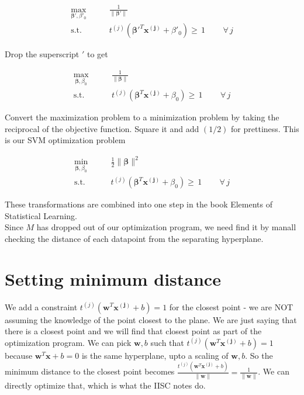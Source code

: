 \documentclass{article}
\newcommand{\beq}{\begin{equation}}
\newcommand{\eeq}{\end{equation}}
\begin{document}
\beq
\label{eqn:formulation5}
\begin{aligned}
  \max_{\pmb{\beta}',\beta'_0} &  \qquad \frac{1}{\|\pmb{\beta}'\|} \\
  \textrm{s.t.} & \qquad {t^{(j)}({\pmb{\beta}'}^T{\pmb{x^{(j)}}} + \beta'_0)} \ge\, 1  \, \qquad \forall \,{j}
\end{aligned}
\eeq

Drop the superscript $'$ to get 

\beq
\label{eqn:formulation6}
\begin{aligned}
  \max_{\pmb{\beta},\beta_0} &  \qquad \frac{1}{\|\pmb{\beta}\|} \\
  \textrm{s.t.} & \qquad {t^{(j)}({\pmb{\beta}}^T{\pmb{x^{(j)}}} + \beta_0)} \ge \, 1  \, \qquad \forall \,{j}
\end{aligned}
\eeq

Convert the maximization problem to a minimization problem by taking the reciprocal of the objective function. Square it and add $(1/2)$ for prettiness. This is our SVM optimization problem

\beq
\label{eqn:formulation7}
\begin{aligned}
  \min_{\pmb{\beta},\beta_0} &  \qquad \frac{1}{2}{\|\pmb{\beta}\|^2} \\
  \textrm{s.t.} & \qquad {t^{(j)}({\pmb{\beta}}^T{\pmb{x^{(j)}}} + \beta_0)} \ge \, 1  \, \qquad \forall \,{j}
\end{aligned}
\eeq

These transformations are combined into one step in the book Elements of Statistical Learning. \\

Since $M$ has dropped out of our optimization program, we need find it by manall checking the distance of each datapoint from the separating hyperplane.


\section{Setting minimum distance}

We add a constraint $t^{(j)}(\pmb{w}^T\pmb{x^{(j)}}+b)=1$ for the closest point - we are NOT assuming the knowledge of the point closest to the plane. We are just saying that there is a closest point and we will find that closest point as part of the optimization program. We can pick $\pmb{w},b$ such that $t^{(j)}(\pmb{w}^T\pmb{x^{(j)}}+b)=1$ because $\pmb{w}^T\pmb{x}+b=0$ is the same hyperplane, upto a scaling of $\pmb{w},b$. So the minimum distance to the closest point becomes $\frac{t^{(j)}(\pmb{w}^T\pmb{x^{(j)}}+b)}{\|\pmb{w}\|}=\frac{1}{\|\pmb{w}\|}$. We can directly optimize that, which is what the IISC notes do.
\end{document}
